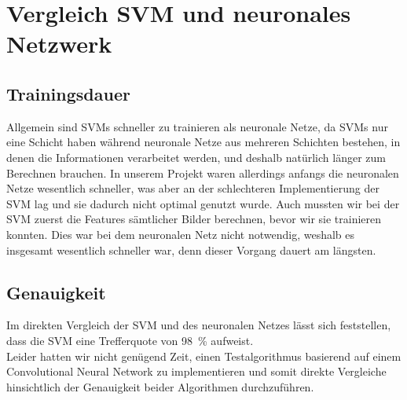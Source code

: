 \section{Vergleich SVM und neuronales Netzwerk}

\subsection{Trainingsdauer}

Allgemein sind SVMs schneller zu trainieren als neuronale Netze, da SVMs nur eine Schicht haben während neuronale Netze aus mehreren Schichten bestehen, in denen die Informationen verarbeitet werden, und deshalb natürlich länger zum Berechnen brauchen. In unserem Projekt waren allerdings anfangs die neuronalen Netze wesentlich schneller, was aber an der schlechteren Implementierung der SVM lag und sie dadurch nicht optimal genutzt wurde. Auch mussten wir bei der SVM zuerst die Features sämtlicher Bilder berechnen, bevor wir sie trainieren konnten. Dies war bei dem neuronalen Netz nicht notwendig, weshalb es insgesamt wesentlich schneller war, denn dieser Vorgang dauert am längsten.

\subsection{Genauigkeit}
Im direkten Vergleich der SVM und des neuronalen Netzes lässt sich feststellen, dass die SVM eine Trefferquote von 98~\% aufweist. \\
Leider hatten wir nicht genügend Zeit, einen Testalgorithmus basierend auf einem Convolutional Neural Network zu implementieren und somit direkte Vergleiche hinsichtlich der Genauigkeit beider Algorithmen durchzuführen.